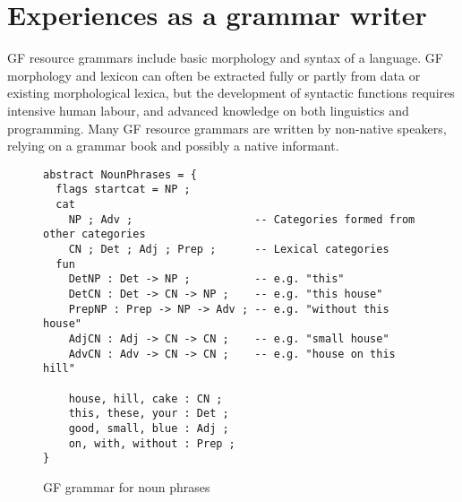 \documentclass[11pt]{article}
\begin{document}
\section{Experiences as a grammar writer}


GF resource grammars include basic morphology and syntax of a language. GF morphology and lexicon can often be extracted fully or partly from data or existing morphological lexica, but the development of syntactic functions requires intensive human labour, and advanced knowledge on both linguistics and programming.
Many GF resource grammars are written by non-native speakers, relying on a grammar book and possibly a native informant.






\begin{figure}[h]
  \centering
    \begin{verbatim}
abstract NounPhrases = {
  flags startcat = NP ;
  cat
    NP ; Adv ;                   -- Categories formed from other categories
    CN ; Det ; Adj ; Prep ;      -- Lexical categories
  fun
    DetNP : Det -> NP ;          -- e.g. "this"
    DetCN : Det -> CN -> NP ;    -- e.g. "this house"
    PrepNP : Prep -> NP -> Adv ; -- e.g. "without this house"
    AdjCN : Adj -> CN -> CN ;    -- e.g. "small house"
    AdvCN : Adv -> CN -> CN ;    -- e.g. "house on this hill"

    house, hill, cake : CN ;
    this, these, your : Det ;
    good, small, blue : Adj ;
    on, with, without : Prep ;
}\end{verbatim}
  \caption{GF grammar for noun phrases}
\label{fig:exampleGrammar}
\end{figure}
\end{document}
